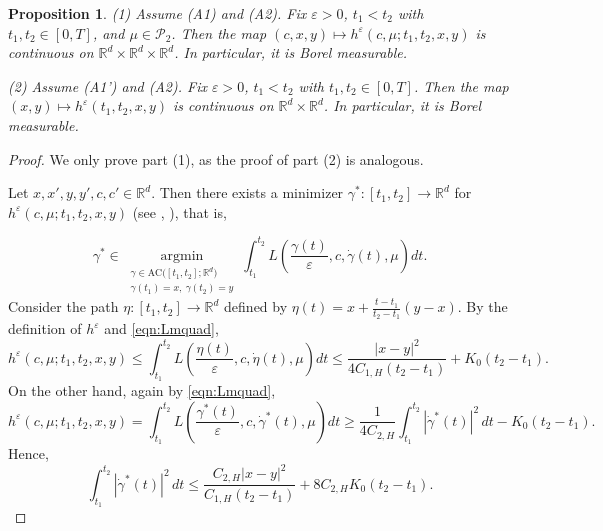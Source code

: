 \documentclass[reqno,11pt]{amsart}
\newtheorem{proposition}[theorem]{Proposition}
\numberwithin{equation}{section}
\newcommand{\R}{\mathbb{R}} %
\newcommand{\e}{\varepsilon}
\newcommand{\ep}{\varepsilon}
\begin{document}
\begin{proposition}\label{prop:mmeas}
(1) Assume (A1) and (A2). Fix $\varepsilon>0$, $t_1<t_2$ with $t_1,t_2\in[0,T]$, and $\mu\in\mathcal{P}_2$.
Then the map $(c,x,y)\mapsto h^\e(c, \mu; t_1, t_2, x,y)$ is continuous on $\mathbb{R}^d\times\mathbb{R}^d\times\mathbb{R}^d$.
In particular, it is Borel measurable.

\noindent
(2) Assume (A1') and (A2). Fix $\varepsilon>0$, $t_1<t_2$ with $t_1,t_2\in[0,T]$. Then the map $(x,y)\mapsto h^\e(t_1,t_2,x,y)$ is continuous on $\mathbb{R}^d\times\mathbb{R}^d$. In particular, it is Borel measurable.
\end{proposition}
\begin{proof} We only prove part (1), as the proof of part (2) is analogous.

Let $x, x',y,y',c,c' \in \R^d$. Then there exists a minimizer $\gamma^\ast: [t_1,t_2] \to \mathbb{R}^d$ for $h^\e(c,\mu;t_1, t_2, x,y)$ (see \cite[Lemma D.2]{tran_hamilton-jacobi_2021}, \cite{cannarsa2004semiconcave}), that is,

\[
\gamma^\ast \in \operatorname*{argmin}_{\substack{
\gamma \in \mathrm{AC}\bigl([t_1,t_2];\mathbb{R}^d\bigr) \\
\gamma(t_1)=x,\ \gamma(t_2)=y
}}\int^{t_2}_{t_1}L\left(\frac{\gamma(t)}{\ep}, c, \dot{\gamma}(t), \mu \right)dt.
\]
Consider the path $\eta:[t_1, t_2] \to \mathbb{R}^d$ defined by $\displaystyle \eta(t)=x+\frac{t-t_1}{t_2-t_1}\left(y-x\right)$. By the definition of $h^\e$ and \eqref{eqn:Lmquad},
\begin{equation}\label{eqn:hupbd}
h^\e\left(c, \mu;t_1, t_2, x, y\right) \leq \int_{t_1}^{t_2} L \left(\frac{\eta(t)}{\ep}, c, \dot{\eta}(t), \mu\right) dt\leq \frac{\left|x-y\right|^2}{4C_{1,H}(t_2-t_1)}+K_0\left(t_2-t_1\right).
\end{equation}
On the other hand, again by \eqref{eqn:Lmquad},
\[
h^\e\left(c, \mu;t_1,t_2, x, y\right)=\int^{t_2}_{t_1}L\left(\frac{\gamma^\ast (t)}{\ep}, c, \dot{\gamma}^\ast(t),\mu \right)dt \geq   \frac{1}{4C_{2,H}}\int_{t_1}^{t_2}\left|\dot{\gamma}^\ast(t)\right|^2 \,dt -K_0(t_2-t_1).
\]
Hence,
\begin{equation}\label{eqn:velbdgst}
\int_{t_1}^{t_2}\left|\dot{\gamma}^\ast(t)\right|^2\,dt \leq \frac{C_{2,H}|x-y|^2}{C_{1,H}(t_2-t_1)}+8C_{2,H}K_0(t_2-t_1).
\end{equation}


\end{proof}
\end{document}
